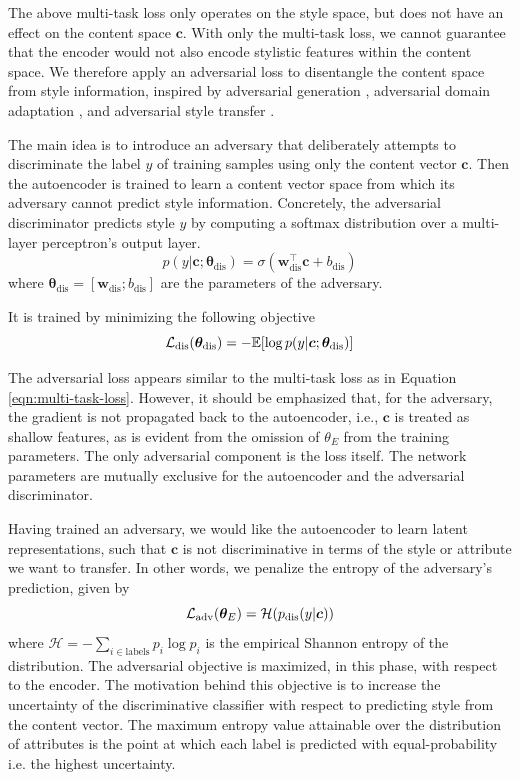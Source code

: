 The above multi-task loss only operates on the style space, but does not have an effect on the content space $\bm c$. With only the multi-task loss, we cannot guarantee that the encoder would not also encode stylistic features within the content space. We therefore apply an adversarial loss to disentangle the content space from style information, inspired by adversarial generation \citep{goodfellow2014generative}, adversarial domain adaptation \citep{liu2017adversarial}, and adversarial style transfer \citep{fu2017style}.

The main idea is to introduce an adversary that deliberately attempts to discriminate the label $y$ of training samples using only the content vector $\bm c$. Then the autoencoder is trained to learn a content vector space from which its adversary cannot predict style information. Concretely, the adversarial discriminator predicts style $y$ by computing a softmax distribution over a multi-layer perceptron's output layer.
\begin{equation}
	p(y | \bm c; \bm\theta_\text{dis}) = \sigma(\bm w_\text{dis}^\top \bm c + b_\text{dis})
\end{equation}
where $\bm\theta_\text{dis}=[\bm w_\text{dis}; b_\text{dis}]$ are the parameters of the adversary.

It is trained by minimizing the following objective
\begin{equation} \label{eqn:adv-disc-loss}
	\mathcal{L}_\text{dis}(\bm\theta_\text{dis}) =
	- \mathbb{E} [\log p(y | \bm c; \bm\theta_\text{dis})]
\end{equation}

The adversarial loss appears similar to the multi-task loss as in Equation \ref{eqn:multi-task-loss}. However, it should be emphasized that, for the adversary, the gradient is not propagated back to the autoencoder, i.e., $\bm c$ is treated as shallow features, as is evident from the omission of $\theta_{E}$ from the training parameters. The only adversarial component is the loss itself. The network parameters are mutually exclusive for the autoencoder and the adversarial discriminator.

Having trained an adversary, we would like the autoencoder to learn latent representations, such that $\bm c$ is not discriminative in terms of the style or attribute we want to transfer. In other words, we penalize the entropy of the adversary's prediction, given by
\begin{equation}
	\mathcal{L}_\text{adv}(\bm\theta_E) = \mathcal{H}(p_\text{dis}(y | \bm c))
\end{equation}
where $\mathcal{H}=-\sum_{i\in\text{labels}} p_i\log p_i$ is the empirical Shannon entropy of the distribution. The adversarial objective is maximized, in this phase, with respect to the encoder. The motivation behind this objective is to increase the uncertainty of the discriminative classifier with respect to predicting style from the content vector. The maximum entropy value attainable over the distribution of attributes is the point at which each label is predicted with equal-probability i.e. the highest uncertainty.


